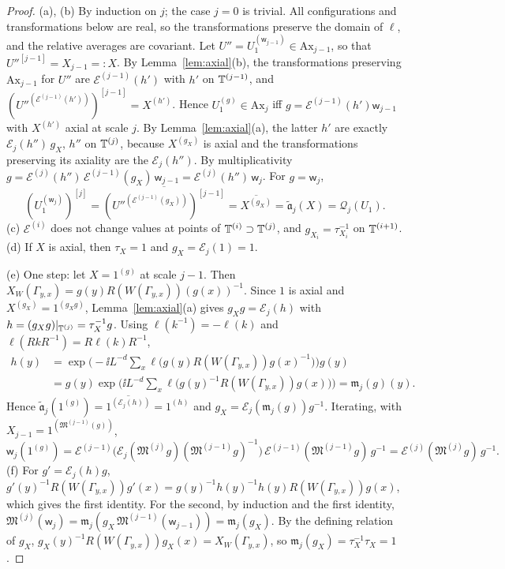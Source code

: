 \begin{proof}
(a), (b) By induction on $j$; the case $j=0$ is trivial. All configurations and transformations below are real, so the transformations preserve the domain of $\ell$, and the relative averages are covariant. Let $U''=U_1^{(\mathsf w_{j-1})}\in\mathrm{Ax}_{j-1}$, so that $U''^{[j-1]}=X_{j-1}=:X$. By Lemma~\ref{lem:axial}(b), the transformations preserving $\mathrm{Ax}_{j-1}$ for $U''$ are $\mathcal E^{(j-1)}(h')$ with $h'$ on $\mathbb T^{(j-1)}$, and $(U''^{(\mathcal E^{(j-1)}(h'))})^{[j-1]}=X^{(h')}$. Hence $U_1^{(g)}\in\mathrm{Ax}_j$ iff $g=\mathcal E^{(j-1)}(h')\mathsf w_{j-1}$ with $X^{(h')}$ axial at scale $j$. By Lemma~\ref{lem:axial}(a), the latter $h'$ are exactly $\mathcal E_j(h'')\,g_X$, $h''$ on $\mathbb T^{(j)}$, because $X^{(g_X)}$ is axial and the transformations preserving its axiality are the $\mathcal E_j(h'')$. By multiplicativity $g=\mathcal E^{(j)}(h'')\,\mathcal E^{(j-1)}(g_X)\,\mathsf w_{j-1}=\mathcal E^{(j)}(h'')\,\mathsf w_j$. For $g=\mathsf w_j$,
\[
(U_1^{(\mathsf w_j)})^{[j]}=\overline{(U''^{(\mathcal E^{(j-1)}(g_X))})^{[j-1]}}=\overline{X^{(g_X)}}=\tilde{\mathfrak a}_j(X)=\mathcal Q_j(U_1).
\]
(c) $\mathcal E^{(i)}$ does not change values at points of $\mathbb T^{(i)}\supset\mathbb T^{(j)}$, and $g_{X_i}=\tau_{X_i}^{-1}$ on $\mathbb T^{(i+1)}$. (d) If $X$ is axial, then $\tau_X=1$ and $g_X=\mathcal E_j(1)=1$.

(e) One step: let $X=1^{(g)}$ at scale $j-1$. Then $X_W(\Gamma_{y,x})=g(y)R(W(\Gamma_{y,x}))(g(x))^{-1}$. Since $1$ is axial and $X^{(g_X)}=1^{(g_Xg)}$, Lemma~\ref{lem:axial}(a) gives $g_Xg=\mathcal E_j(h)$ with $h=(g_Xg)|_{\mathbb T^{(j)}}=\tau_X^{-1}g$. Using $\ell(k^{-1})=-\ell(k)$ and $\ell(RkR^{-1})=R\ell(k)R^{-1}$,
\[
\begin{aligned}
h(y)&=\exp\Big(-\ii L^{-d}\sum_x\ell\big(g(y)R(W(\Gamma_{y,x}))g(x)^{-1}\big)\Big)g(y)\\
&=g(y)\exp\Big(\ii L^{-d}\sum_x\ell\big(g(y)^{-1}R(W(\Gamma_{y,x}))g(x)\big)\Big)=\mathfrak m_j(g)(y).
\end{aligned}
\]
Hence $\tilde{\mathfrak a}_j(1^{(g)})=\overline{1^{(\mathcal E_j(h))}}=1^{(h)}$ and $g_X=\mathcal E_j(\mathfrak m_j(g))g^{-1}$. Iterating, with $X_{j-1}=1^{(\mathfrak M^{(j-1)}(g))}$,
\[
\mathsf w_j(1^{(g)})=\mathcal E^{(j-1)}\big(\mathcal E_j(\mathfrak M^{(j)}g)(\mathfrak M^{(j-1)}g)^{-1}\big)\,\mathcal E^{(j-1)}(\mathfrak M^{(j-1)}g)\,g^{-1}=\mathcal E^{(j)}(\mathfrak M^{(j)}g)\,g^{-1}.
\]
(f) For $g'=\mathcal E_j(h)g$, $g'(y)^{-1}R(W(\Gamma_{y,x}))g'(x)=g(y)^{-1}h(y)^{-1}h(y)R(W(\Gamma_{y,x}))g(x)$, which gives the first identity. For the second, by induction and the first identity, $\mathfrak M^{(j)}(\mathsf w_j)=\mathfrak m_j(g_X\,\mathfrak M^{(j-1)}(\mathsf w_{j-1}))=\mathfrak m_j(g_X)$. By the defining relation of $g_X$, $g_X(y)^{-1}R(W(\Gamma_{y,x}))g_X(x)=X_W(\Gamma_{y,x})$, so $\mathfrak m_j(g_X)=\tau_X^{-1}\tau_X=1$.
\end{proof}

